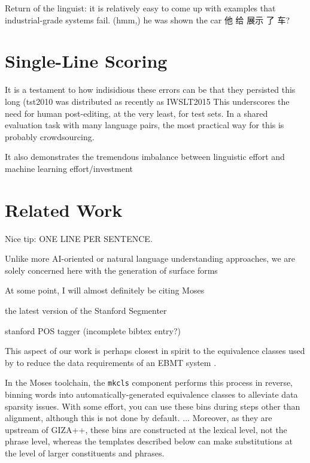 Return of the linguist: it is relatively easy to come up with examples that industrial-grade systems fail. (hmm,)
he was shown the car
他 给 展示 了 车?

\section{Single-Line Scoring}

It is a testament to how indisidious these errors can be that they persisted this long (tst2010 was distributed as recently as IWSLT2015
This underscores the need for human post-editing, at the very least, for test sets.
In a shared evaluation task with many language pairs, the most practical way for this is probably crowdsourcing.

It also demonstrates the tremendous imbalance between linguistic effort and machine learning effort/investment


\section{Related Work}
\label{sec:related}

Nice tip: ONE LINE PER SENTENCE.

Unlike more AI-oriented or natural language understanding approaches, we are solely concerned here with the generation of surface forms

At some point, I will almost definitely be citing Moses 

the latest version of the Stanford Segmenter 

stanford POS tagger (incomplete bibtex entry?) 

This aspect of our work is perhaps closest in spirit to the equivalence classes used by  to reduce the data requirements of an EBMT system .

In the Moses toolchain, the {\small \tt mkcls} component  performs this process in reverse, binning words into automatically-generated equivalence classes to alleviate data sparsity issues.
With some effort, you can use these bins during steps other than alignment, although this is not done by default.
...
Moreover, as they are upstream of GIZA++, these bins are constructed at the lexical level, not the phrase level, whereas the templates described below can make substitutions at the level of larger constituents and phrases.


